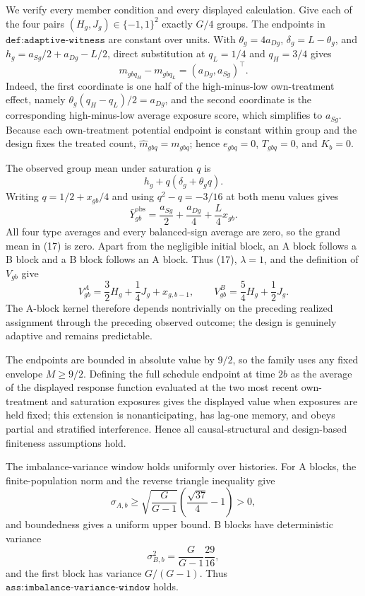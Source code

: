We verify every member condition and every displayed calculation.  Give each of the four pairs \((H_g,J_g)\in\{-1,1\}^2\) exactly \(G/4\) groups.  The endpoints in \(\texttt{def:adaptive-witness}\) are constant over units.  With \(\theta_g=4a_{Dg}\), \(\delta_g=L-\theta_g\), and \(h_g=a_{Sg}/2+a_{Dg}-L/2\), direct substitution at \(q_L=1/4\) and \(q_H=3/4\) gives
\[
 m_{gbq_H}-m_{gbq_L}=(a_{Dg},a_{Sg})^\top.                    \tag{16}
\]
Indeed, the first coordinate is one half of the high-minus-low own-treatment effect, namely \(\theta_g(q_H-q_L)/2=a_{Dg}\), and the second coordinate is the corresponding high-minus-low average exposure score, which simplifies to \(a_{Sg}\).  Because each own-treatment potential endpoint is constant within group and the design fixes the treated count, \(\widehat m_{gbq}=m_{gbq}\); hence \(e_{gbq}=0\), \(T_{gbq}=0\), and \(K_b=0\).

The observed group mean under saturation \(q\) is
\[
 h_g+q(\delta_g+\theta_gq).
\]
Writing \(q=1/2+x_{gb}/4\) and using \(q^2-q=-3/16\) at both menu values gives
\[
 \bar Y^{\mathrm{obs}}_{gb}
 =\frac{a_{Sg}}2+\frac{a_{Dg}}4+\frac L4x_{gb}.               \tag{17}
\]
All four type averages and every balanced-sign average are zero, so the grand mean in (17) is zero.  Apart from the negligible initial block, an A block follows a B block and a B block follows an A block.  Thus (17), \(\lambda=1\), and the definition of \(V_{gb}\) give
\[
 V_{gb}^{A}=\frac32H_g+\frac14J_g+x_{g,b-1},
 \qquad
 V_{gb}^{B}=\frac54H_g+\frac12J_g.                            \tag{18}
\]
The A-block kernel therefore depends nontrivially on the preceding realized assignment through the preceding observed outcome; the design is genuinely adaptive and remains predictable.

The endpoints are bounded in absolute value by \(9/2\), so the family uses any fixed envelope \(M\geq9/2\).  Defining the full schedule endpoint at time \(2b\) as the average of the displayed response function evaluated at the two most recent own-treatment and saturation exposures gives the displayed value when exposures are held fixed; this extension is nonanticipating, has lag-one memory, and obeys partial and stratified interference.  Hence all causal-structural and design-based finiteness assumptions hold.

The imbalance-variance window holds uniformly over histories.  For A blocks, the finite-population norm and the reverse triangle inequality give
\[
 \sigma_{A,b}
 \geq\sqrt{\frac G{G-1}}\left(\frac{\sqrt{37}}4-1\right)>0,
\]
and boundedness gives a uniform upper bound.  B blocks have deterministic variance
\[
 \sigma_{B,b}^2=\frac G{G-1}\frac{29}{16},
\]
and the first block has variance \(G/(G-1)\).  Thus \(\texttt{ass:imbalance-variance-window}\) holds.

